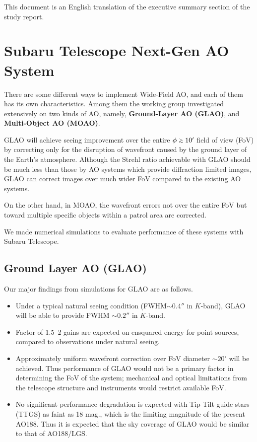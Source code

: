 This document is an English translation of the executive summary section
of the study report.

\medskip


\section{Subaru Telescope Next-Gen AO System}

There are some different ways to implement Wide-Field AO, and each of
them has its own characteristics. 
Among them the working group
investigated extensively on two kinds of AO, namely,
{\bf Ground-Layer AO (GLAO)}, and {\bf Multi-Object AO (MOAO)}.

GLAO will achieve seeing improvement over the entire $\phi \gsim 10'$ field
of view (FoV) by correcting only for the disruption of wavefront caused
by the ground layer of the Earth's atmosphere. Although the Strehl ratio
achievable with GLAO should be much less than those by AO systems which
provide diffraction limited images, GLAO can correct images over much
wider FoV compared to the existing AO systems.

On the other hand, in MOAO, the wavefront errors not over the entire FoV
but toward multiple specific objects within a patrol area are
corrected. 

We made numerical simulations to evaluate performance of these systems
with Subaru Telescope. 

\subsection{Ground Layer AO (GLAO)}

Our major findings from simulations for GLAO are as follows. 
\begin{itemize}
 \setlength{\itemsep}{-3pt}
 \item Under a typical natural seeing condition (FWHM$\sim 0.4''$ in
       $K$-band), GLAO will be able to provide FWHM $\sim 0.2''$ in
       $K$-band. 
 \item Factor of 1.5--2 gains are expected on ensquared energy for point 
       sources, compared to observations under natural seeing.
 \item Approximately uniform wavefront correction over FoV diameter
       $\sim 20'$ will be achieved. Thus performance of GLAO would not
       be a primary factor in determining the FoV of the system;
       mechanical and optical limitations from the telescope structure
       and instruments would restrict available FoV.
 \item No significant performance degradation is expected with Tip-Tilt
       guide stars (TTGS) as faint as 18 mag., which is the limiting
       magnitude of the present AO188. Thus it is expected that the sky
       coverage of GLAO would be similar to that of AO188/LGS.
\end{itemize}

